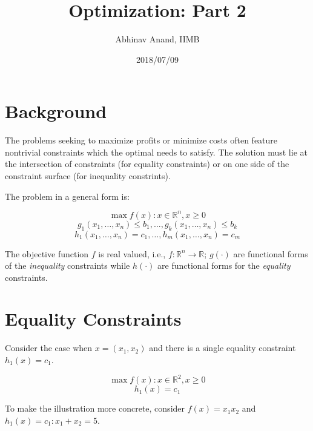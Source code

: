 \documentclass[11pt,]{article}
\title{Optimization: Part 2}
\author{Abhinav Anand, IIMB}
\date{2018/07/09}
\begin{document}
\maketitle

\section{Background}\label{background}

The problems seeking to maximize profits or minimize costs often feature
nontrivial constraints which the optimal needs to satisfy. The solution
must lie at the intersection of constraints (for equality constraints)
or on one side of the constraint surface (for inequality constrints).

The problem in a general form is:

\[
\max f(x): x\in \mathbb{R}^n, x\geq 0
\] \[
g_1(x_1,\hdots,x_n)\leq b_1,\hdots,g_k(x_1,\hdots,x_n)\leq b_k
\] \[
h_1(x_1,\hdots,x_n)= c_1,\hdots,h_m(x_1,\hdots,x_n)= c_m
\]

The objective function \(f\) is real valued, i.e.,
\(f:\mathbb{R}^n \to \mathbb{R}\); \(g(\cdot)\) are functional forms of
the \emph{inequality} constraints while \(h(\cdot)\) are functional
forms for the \emph{equality} constraints.

\section{Equality Constraints}\label{equality-constraints}

Consider the case when \(x=(x_1, x_2)\) and there is a single equality
constraint \(h_1(x) = c_1\).

\[
\max f(x): x\in \mathbb{R}^2, x\geq 0
\] \[
h_1(x) = c_1
\]

To make the illustration more concrete, consider \(f(x) = x_1x_2\) and
\(h_1(x)=c_1:x_1+ x_2=5\).
\end{document}
